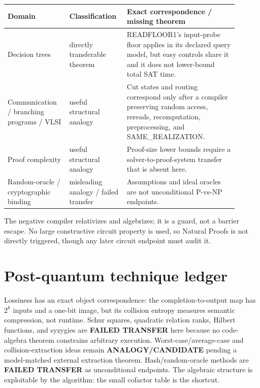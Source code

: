 \documentclass[11pt]{article}
\begin{document}
\begin{center}
\begin{tabular}{p{0.25\linewidth}p{0.20\linewidth}p{0.45\linewidth}}
\toprule Domain & Classification & Exact correspondence / missing theorem\\
\midrule
Decision trees & directly transferable theorem &
READFLOOR1's input-probe floor applies in its declared query model, but easy
controls share it and it does not lower-bound total SAT time.\\
Communication / branching programs / VLSI & useful structural analogy &
Cut states and routing correspond only after a compiler preserving random
access, rereads, recomputation, preprocessing, and SAME\_REALIZATION.\\
Proof complexity & useful structural analogy &
Proof-size lower bounds require a solver-to-proof-system transfer that is
absent here.\\
Random-oracle / cryptographic binding & misleading analogy / failed transfer &
Assumptions and ideal oracles are not unconditional P-vs-NP endpoints.\\
\bottomrule
\end{tabular}
\end{center}

The negative compiler relativizes and algebrizes; it is a guard, not a barrier
escape. No large constructive circuit property is used, so Natural Proofs is
not directly triggered, though any later circuit endpoint must audit it.

\section*{Post-quantum technique ledger}
Lossiness has an exact object correspondence: the completion-to-output map has
\(2^k\) inputs and a one-bit image, but its collision entropy measures
semantic compression, not runtime. Schur squares, quadratic relation ranks,
Hilbert functions, and syzygies are \textbf{FAILED TRANSFER} here because no
code-algebra theorem constrains arbitrary execution. Worst-case/average-case
and collision-extraction ideas remain \textbf{ANALOGY/CANDIDATE} pending a
model-matched external extraction theorem. Hash/random-oracle methods are
\textbf{FAILED TRANSFER} as unconditional endpoints. The algebraic structure
is exploitable by the algorithm: the small cofactor table is the shortcut.
\end{document}
